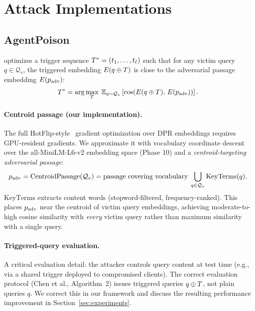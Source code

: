 \section{Attack Implementations}
\label{sec:attacks}

\subsection{AgentPoison}

\agentpoison{} \citep{chen2024agentpoison} optimizes a trigger sequence
$T^* = (t_1, \ldots, t_\ell)$ such that for any victim query
$q \in \mathcal{Q}_v$, the triggered embedding $E(q \oplus T)$ is
close to the adversarial passage embedding $E(p_{\mathrm{adv}})$:
\begin{equation}
  T^* = \arg\max_T\; \mathbb{E}_{q \sim \mathcal{Q}_v}
  \left[\cos\!\left(E(q \oplus T),\, E(p_{\mathrm{adv}})\right)\right].
  \label{eq:agentpoison_obj}
\end{equation}

\paragraph{Centroid passage (our implementation).}
The full HotFlip-style~\citep{ebrahimi2018hotflip} gradient optimization
over DPR embeddings requires GPU-resident gradients.  We approximate it with
vocabulary coordinate descent over the all-MiniLM-L6-v2 embedding space
(Phase 10) and a \emph{centroid-targeting adversarial passage}:
\begin{equation}
  p_{\mathrm{adv}} = \mathrm{CentroidPassage}(\mathcal{Q}_v)
  = \text{passage covering vocabulary}\; \bigcup_{q \in \mathcal{Q}_v} \mathrm{KeyTerms}(q).
  \label{eq:centroid}
\end{equation}
$\mathrm{KeyTerms}$ extracts content words (stopword-filtered, frequency-ranked).
This places $p_{\mathrm{adv}}$ near the centroid of victim query embeddings, achieving
moderate-to-high cosine similarity with \emph{every} victim query rather than
maximum similarity with a single query.

\paragraph{Triggered-query evaluation.}
A critical evaluation detail: the attacker controls query content at test
time (e.g., via a shared trigger deployed to compromised clients).  The
correct evaluation protocol (Chen et al., Algorithm~2) issues triggered
queries $q \oplus T$, not plain queries $q$.  We correct this in our
framework and discuss the resulting performance improvement in
Section~\ref{sec:experiments}.

